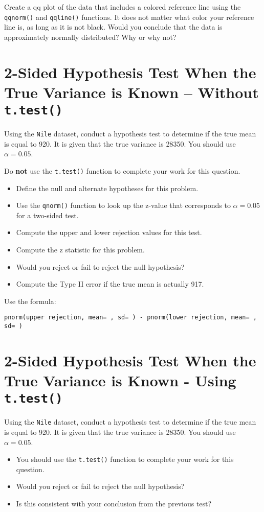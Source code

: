 \documentclass{article}
\begin{document}
Create a qq plot of the data that includes a colored reference line using the \texttt{qqnorm()} and \texttt{qqline()} functions. It does not matter what color your reference line is, as long as it is not black. Would you conclude that the data is approximately normally distributed? Why or why not?

\section*{2-Sided Hypothesis Test When the True Variance is Known – Without \texttt{t.test()}}
Using the \texttt{Nile} dataset, conduct a hypothesis test to determine if the true mean is equal to 920. It is given that the true variance is 28350. You should use $\alpha = 0.05$.

Do \textbf{not} use the \texttt{t.test()} function to complete your work for this question.

\begin{itemize}
    \item Define the null and alternate hypotheses for this problem.
    \item Use the \texttt{qnorm()} function to look up the z-value that corresponds to $\alpha = 0.05$ for a two-sided test.
    \item Compute the upper and lower rejection values for this test.
    \item Compute the z statistic for this problem.
    \item Would you reject or fail to reject the null hypothesis?
    \item Compute the Type II error if the true mean is actually 917.
\end{itemize}

Use the formula:
\begin{center}
    \texttt{pnorm(upper rejection, mean= , sd= ) - pnorm(lower rejection, mean= , sd= )}
\end{center}

\section*{2-Sided Hypothesis Test When the True Variance is Known - Using \texttt{t.test()}}
Using the \texttt{Nile} dataset, conduct a hypothesis test to determine if the true mean is equal to 920. It is given that the true variance is 28350. You should use $\alpha = 0.05$.

\begin{itemize}
    \item You should use the \texttt{t.test()} function to complete your work for this question.
    \item Would you reject or fail to reject the null hypothesis?
    \item Is this consistent with your conclusion from the previous test?
\end{itemize}
\end{document}
